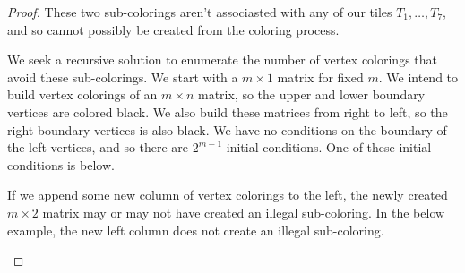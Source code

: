 \documentclass[12pt]{article}
\theoremstyle{plain}
\theoremstyle{definition}
\theoremstyle{remark}
\theoremstyle{definition}
\newcommand{\cell}[4]{ \draw[thick] ( #1 , #2 ) rectangle ( #3 , #4 );}
\begin{document}
\begin{proof}
These two sub-colorings aren't associasted with any of our tiles $T_1, \dots, T_7$, and so cannot possibly be created from the coloring process. 

We seek a recursive solution to enumerate the number of vertex colorings that avoid these sub-colorings. We start with a $m \times 1$ matrix for fixed $m$. We intend to build vertex colorings of an $m \times n$ matrix, so the upper and lower boundary vertices are colored black. We also build these matrices from right to left, so the right boundary vertices is also black. We have no conditions on the boundary of the left vertices, and so there are $2^{m-1}$ initial conditions. One of these initial conditions is below.

\begin{center}
\end{center}

If we append some new column of vertex colorings to the left, the newly created $m \times 2$ matrix may or may not have created an illegal sub-coloring. In the below example, the new left column does not create an illegal sub-coloring.  

\begin{center}
\end{center}
\end{proof}
\end{document}
